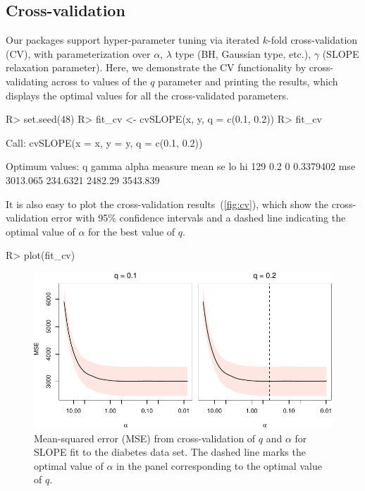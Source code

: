 \documentclass[article]{jss}
\makeatletter
\let\natwidth\Gin@nat@width
\makeatother
\begin{document}
\subsection{Cross-validation}

Our packages support hyper-parameter tuning via iterated \(k\)-fold
cross-validation (CV), with parameterization over \(\alpha\), \(\lambda\) type (BH,
Gaussian type, etc.), \(\gamma\) (SLOPE relaxation parameter).
Here, we demonstrate the CV functionality by cross-validating across
to values of the \(q\) parameter and printing the results,
which displays the optimal values for all the cross-validated parameters.

\begin{CodeChunk}
  \begin{CodeInput}
R> set.seed(48)
R> fit_cv <- cvSLOPE(x, y, q = c(0.1, 0.2))
R> fit_cv
\end{CodeInput}
  \begin{CodeOutput}
Call:
cvSLOPE(x = x, y = y, q = c(0.1, 0.2))

Optimum values:
      q gamma     alpha measure     mean       se      lo       hi
129 0.2     0 0.3379402     mse 3013.065 234.6321 2482.29 3543.839
\end{CodeOutput}
\end{CodeChunk}

It is also easy to plot the cross-validation results~(\autoref{fig:cv}), which
show the cross-validation error with 95\% confidence intervals and a dashed
line indicating the optimal value of \(\alpha\) for the best value of \(q\).

\begin{Code}
R> plot(fit_cv)
\end{Code}

\begin{figure}[tp]
  \centering
  \includegraphics[width=\natwidth]{images/slope-cv.pdf}
  \caption{%
    Mean-squared error (MSE) from cross-validation of
    \(q\) and \(\alpha\) for SLOPE fit to the diabetes data set.
    The dashed line marks the optimal value of \(\alpha\) in the
    panel corresponding to the optimal value of \(q\).
  }
  \label{fig:cv}
\end{figure}
\end{document}

